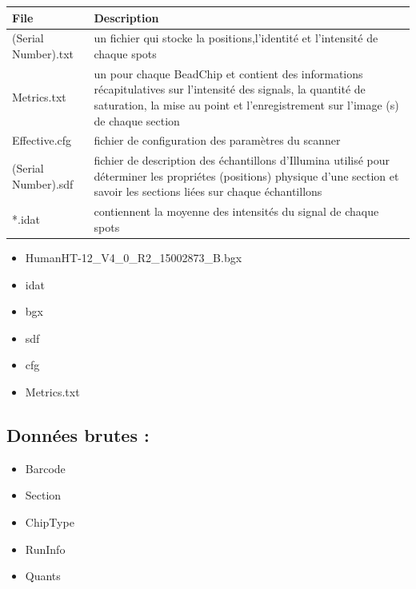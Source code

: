 \documentclass[a4paper,10pt]{article}
\begin{document}
\begin{tabular}{|l|p{9cm}|}
\hline
File  & Description \\
\hline
 (Serial Number).txt & un fichier qui stocke la positions,l'identité et l'intensité de chaque spots\\
\hline
Metrics.txt &  un pour chaque BeadChip  et contient des informations récapitulatives sur l'intensité des signals,
la quantité de saturation, la mise au point et l'enregistrement sur l'image (s) de chaque section \\
\hline 
Effective.cfg & fichier de configuration des paramètres du scanner\\
\hline
(Serial Number).sdf & fichier de description des échantillons d'Illumina utilisé pour déterminer les propriétes (positions)
physique d'une section et savoir les sections liées sur chaque échantillons\\
\hline
*.idat & contiennent la moyenne des intensités du signal de chaque spots \\
\hline
\end{tabular}

\begin{itemize}
 \item HumanHT-12\_V4\_0\_R2\_15002873\_B.bgx
 \item idat
 \item bgx
 \item sdf
 \item cfg
 \item Metrics.txt
\end{itemize}
\subsection{ Données brutes :}
\begin{itemize}
 \item  Barcode  
\item  Section 
\item  ChipType 
\item  RunInfo 
\item  Quants
\end{itemize}
\end{document}
